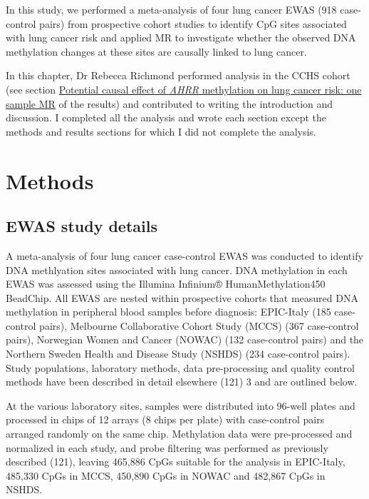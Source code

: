 \documentclass[11pt,oneside]{bristolthesis}
\begin{document}
In this study, we performed a meta-analysis of four lung cancer EWAS (918 case-control pairs) from prospective cohort studies to identify CpG sites associated with lung cancer risk and applied MR to investigate whether the observed DNA methylation changes at these sites are causally linked to lung cancer.

In this chapter, Dr Rebecca Richmond performed analysis in the CCHS cohort (see section \protect\hyperlink{potential-causal-effect-of-ahrr-methylation-on-lung-cancer-risk-one-sample-mr}{Potential causal effect of \emph{AHRR} methylation on lung cancer risk: one sample MR} of the results) and contributed to writing the introduction and discussion. I completed all the analysis and wrote each section except the methods and results sections for which I did not complete the analysis.

\hypertarget{methods-07}{%
\section{Methods}\label{methods-07}}

\hypertarget{ewas-study-details}{%
\subsection{EWAS study details}\label{ewas-study-details}}

A meta-analysis of four lung cancer case-control EWAS was conducted to identify DNA methlyation sites associated with lung cancer. DNA methylation in each EWAS was assessed using the Illumina Infinium® HumanMethylation450 BeadChip. All EWAS are nested within prospective cohorts that measured DNA methylation in peripheral blood samples before diagnosis: EPIC-Italy (185 case-control pairs), Melbourne Collaborative Cohort Study (MCCS) (367 case-control pairs), Norwegian Women and Cancer (NOWAC) (132 case-control pairs) and the Northern Sweden Health and Disease Study (NSHDS) (234 case-control pairs). Study populations, laboratory methods, data pre-processing and quality control methods have been described in detail elsewhere (121) 3 and are outlined below.

At the various laboratory sites, samples were distributed into 96-well plates and processed in chips of 12 arrays (8 chips per plate) with case-control pairs arranged randomly on the same chip. Methylation data were pre-processed and normalized in each study, and probe filtering was performed as previously described (121), leaving 465,886 CpGs suitable for the analysis in EPIC-Italy, 485,330 CpGs in MCCS, 450,890 CpGs in NOWAC and 482,867 CpGs in NSHDS.
\end{document}
